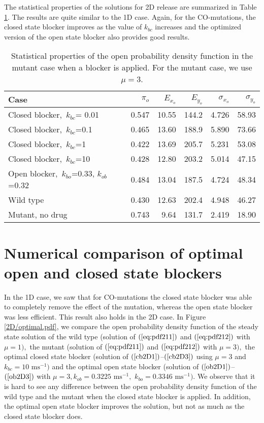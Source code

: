 The statistical properties of the solutions for 2D release are summarized in Table \ref{tab:drg_tab_2D}. The results are quite similar to the 1D case. Again, for the CO-mutations, the closed state blocker improves as the value of $k_{bc}$ increases and the optimized version of the open state blocker also provides good results.

\begin{table}  \begin{center}
\begin{tabular}
[c]{|l|r|r|r|r|r|}\hline
Case & $\pi_o$ & $E_{x_o}$ &
 $E_{y_o}$ & $\sigma_{x_o}$ & $\sigma_{y_o}$ \\[1mm]\hline\hline
Closed blocker,\ $k_{bc}$= 0.01 & 0.547 & 10.55 & 144.2 &4.726 &  58.93\\\hline
Closed blocker,\ $k_{bc}$=0.1 & 0.465 & 13.60 & 188.9 & 5.890 &  73.66  \\\hline
Closed blocker,\ $k_{bc}$=1 & 0.422 & 13.69 & 205.7 &   5.231 &   53.08 \\\hline
Closed blocker,\ $k_{bc}$=10 & 0.428 & 12.80 & 203.2 &  5.014 &  47.15  \\\hline
Open blocker,\ $k_{bo}$=0.33, $k_{ob}$=0.32 & 0.484 & 13.04 & 187.5 &  4.724 &  48.34 \\\hline  \hline
Wild type & 0.430 & 12.63 & 202.4 &4.948  & 46.27  \\\hline
Mutant, no drug & 0.743 & 9.64 & 131.7 & 2.419 &  18.90  \\ \hline
\end{tabular}
 \end{center}
\caption{Statistical properties of the open probability density function in the mutant case when a blocker is applied.  For the mutant case, we use $\mu=3$.
\label{tab:drg_tab_2D}}
\end{table}


\section[Numerical comparison of blockers]{Numerical comparison of optimal open and closed state blockers}

In the 1D case, we saw that for CO-mutations the closed state blocker was able 
to completely remove the effect of the mutation, whereas the open state blocker 
was less efficient.
This result also holds in the 2D case. In Figure \ref{2D/optimal.pdf}, we compare the open
probability density function of the steady state solution of the wild type
(solution of $(\ref{eq:pdf211})$ and $(\ref{eq:pdf212})$ with $\mu=1),$ the mutant
(solution of $(\ref{eq:pdf211})$ and $(\ref{eq:pdf212})$ with $\mu=3),$ the optimal closed state blocker
(solution of $(\ref{cb2D1})$--$(\ref{cb2D3})$ using $\mu=3$ and $k_{bc}=10\text{ ms}^{-1})$ and the optimal
open state blocker (solution of $(\ref{ob2D1})$--$(\ref{ob2D3})$ with $\mu=3,k_{ob}=0.3225\text{ ms}^{-1},$
$k_{bo}=0.3346\text{ ms}^{-1}).$ We observe that it is hard to see any difference between the open probability
density function of the wild type and the mutant when the closed state blocker is applied. In addition,
the optimal open state blocker improves the solution, but not as much as the closed state blocker does.

